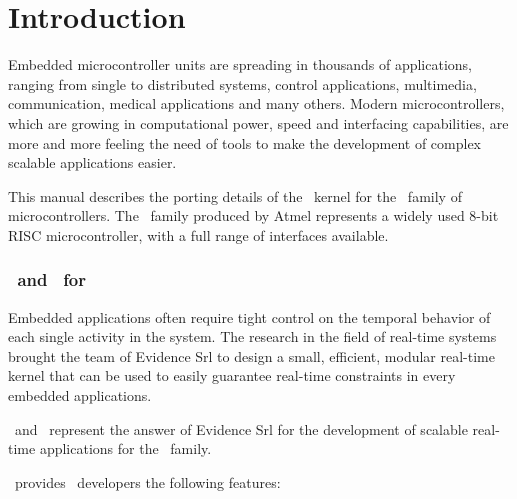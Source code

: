 \chapter[Introduction]{Introduction}
\label{cha:introduction}

Embedded microcontroller units are spreading in thousands of
applications, ranging from single to distributed systems, control
applications, multimedia, communication, medical applications and many
others. Modern microcontrollers, which are growing in computational
power, speed and interfacing capabilities, are more and more feeling
the need of tools to make the development of complex scalable
applications easier.

This manual describes the porting details of the \ee\ kernel
for the \avr\ family of microcontrollers. The \avr\ family produced by
Atmel represents a widely used 8-bit RISC microcontroller, with a full
range of interfaces available.

\subsection{\ee\ and \rtd\ for \avr}

Embedded applications often require tight control on the temporal
behavior of each single activity in the system. The research in the
field of real-time systems brought the team of Evidence Srl to design
a small, efficient, modular real-time kernel that can be used to
easily guarantee real-time constraints in every embedded applications.

\ee\ and \rtd\ represent the answer of Evidence Srl for the
development of scalable real-time applications for the \avr\
family.

\ee\ provides \avr\ developers the following features:

